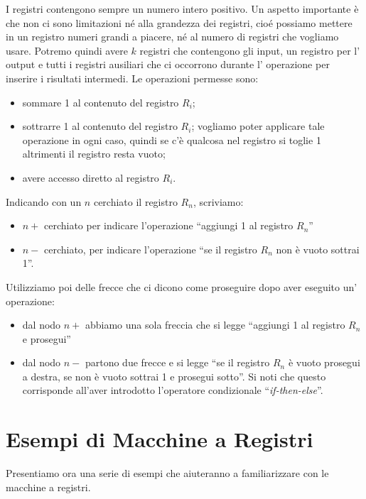 I registri contengono sempre un numero intero positivo. Un aspetto
importante \`e che non ci sono limitazioni n\'e alla grandezza dei
registri, cio\'e possiamo mettere in un registro numeri grandi a
piacere, n\'e al numero di registri che vogliamo usare. Potremo quindi
avere \( k \) registri che contengono gli input, un registro per l'
output e tutti i registri ausiliari che ci occorrono durante l'
operazione per inserire i risultati intermedi. Le operazioni permesse
sono:
\begin{itemize}
\item sommare 1 al contenuto del registro \( R_i \);
\item sottrarre 1 al contenuto del registro \( R_i \); vogliamo poter
  applicare tale operazione in ogni caso, quindi se c'\`e qualcosa nel
  registro si toglie 1 altrimenti il registro resta vuoto;
\item avere accesso diretto al registro \( R_i \).
\end{itemize}

Indicando con un \( n \) cerchiato il registro \( R_n \), scriviamo:
\begin{itemize}
\item \( n+ \) cerchiato per indicare l'operazione ``aggiungi 1 al registro \( R_n \)''
\item  \( n- \) cerchiato, per indicare l'operazione ``se il registro \( R_n \) non \`e vuoto
sottrai 1''.
\end{itemize}

Utiliz\-zia\-mo poi delle frecce che ci dicono come proseguire dopo
aver eseguito un' operazione:
\begin{itemize}
\item dal nodo \( n+ \) abbiamo una sola freccia che si legge
  ``aggiungi 1 al registro \( R_n \) e prosegui''
\item dal nodo \( n- \) partono due frecce e si legge ``se il registro
  \( R_n \) \`e vuoto prosegui a destra, se non \`e vuoto sottrai 1 e
  prosegui sotto''. Si noti che questo corrisponde all'aver introdotto
  l'operatore condizionale ``\emph{if-then-else}''.
\end{itemize}

\section{Esempi di Macchine a Registri}
Presentiamo ora una serie di esempi che aiuteranno a familiarizzare
con le macchine a registri.

